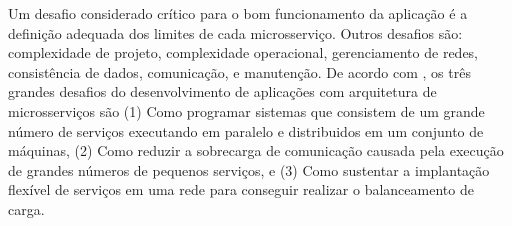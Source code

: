 Um desafio considerado crítico para o bom funcionamento da aplicação é a definição adequada dos limites de cada microsserviço. Outros desafios são: complexidade de projeto, complexidade operacional, gerenciamento de redes, consistência de dados, comunicação, e manutenção. De acordo com , os três grandes desafios do desenvolvimento de aplicações com arquitetura de microsserviços são (1) Como programar sistemas que consistem de um grande número de serviços executando em paralelo e distribuidos em um conjunto de máquinas, (2) Como reduzir a sobrecarga de comunicação causada pela execução de grandes números de pequenos serviços, e (3) Como sustentar a implantação flexível de serviços em uma rede para conseguir realizar o balanceamento de carga. \cite{martin-fowler-monolith-first}









